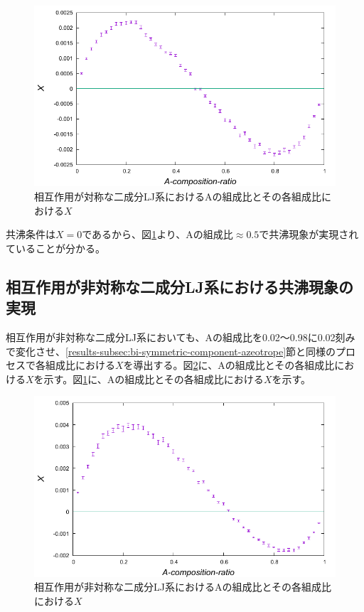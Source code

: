 \documentclass[titlepage]{jsreport}
\begin{document}
\begin{figure}[htbp]
    \begin{center}
        \includegraphics[width=14cm]{fig/bi-symmetric/L100T1.0.pdf}
    \end{center}
    \caption{相互作用が対称な二成分LJ系におけるAの組成比とその各組成比における$X$}
    \label{fig:bi-symmetric}
\end{figure}

\newpage
共沸条件は$X=0$であるから、図\ref{fig:bi-symmetric}より、Aの組成比$\approx0.5$で共沸現象が実現されていることが分かる。


\subsection{相互作用が非対称な二成分LJ系における共沸現象の実現} \label{results-subsec:bi-asymmetric-component-azeotrope}
相互作用が非対称な二成分LJ系においても、Aの組成比を0.02〜0.98に0.02刻みで変化させ、\ref{results-subsec:bi-symmetric-component-azeotrope}節と同様のプロセスで各組成比における$X$を導出する。図\ref{fig:bi-asymmetric}に、Aの組成比とその各組成比における$X$を示す。図\ref{fig:bi-symmetric}に、Aの組成比とその各組成比における$X$を示す。

\begin{figure}[htbp]
    \begin{center}
        \includegraphics[width=14cm]{fig/bi-asymmetric/L100T1.0E1.05.pdf}
    \end{center}
    \caption{相互作用が非対称な二成分LJ系におけるAの組成比とその各組成比における$X$}
    \label{fig:bi-asymmetric}
\end{figure}
\end{document}
